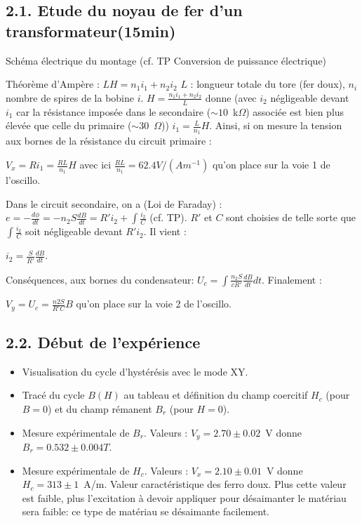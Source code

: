\documentclass[french, a4paper, 10pt, twocolumn, landscape]{article}
\begin{document}
\subsection*{2.1. Etude du noyau de fer d'un transformateur(15min)}

Schéma électrique du montage (cf. TP Conversion de puissance électrique)

Théorème d'Ampère : $L H = n_1 i_1 + n_2 i_2$
$L$ : longueur totale du tore (fer doux), $n_i$ nombre de spires de la bobine $i$. $H = \frac{n_1 i_1 + n_2 i_2}{L}$ donne (avec $i_2$ négligeable devant $i_1$ car la résistance imposée dans le secondaire ($\sim 10$~k$\Omega$) associée est bien plus élevée que celle du primaire ($\sim 30$~$\Omega$)) $i_1 = \frac{L}{n_1} H$. Ainsi, si on mesure la tension aux bornes de la résistance du circuit primaire : 

$V_x = R i_1 = \frac{R L}{n_1} H$ avec ici $\frac{R L}{n_1} = 62.4 V/(Am^{-1})$ qu'on place sur la voie 1 de l'oscillo.

Dans le circuit secondaire, on a (Loi de Faraday) : $e = -\frac{d \phi}{d t} = -n_2 S \frac{d B}{d t} = R' i_2 + \int \frac{i_2}{C}$ (cf. TP). $R'$ et $C$ sont choisies de telle sorte que $\int \frac{i_2}{C}$ soit négligeable devant $R' i_2$. Il vient :

$i_2 = \frac{S}{R'} \frac{d B}{d t}$.

Conséquences, aux bornes du condensateur: $U_c = \int \frac{n_2 S}{c R'} \frac{d B}{d t} d t$. Finalement :

$V_y = U_c = \frac{n2 S}{R' C} B$ qu'on place sur la voie 2 de l'oscillo.

\subsection*{2.2. Début de l'expérience}

\begin{itemize}
    \item Visualisation du cycle d'hystérésis avec le mode XY.
    \item Tracé du cycle $B(H)$ au tableau et définition du champ coercitif $H_c$ (pour $B=0$) et du champ rémanent $B_r$ (pour $H=0$).
    \item Mesure expérimentale de $B_r$. Valeurs : $V_y = 2.70 \pm 0.02$~V donne $B_r = 0.532 \pm 0.004 T$. 
    \item Mesure expérimentale de $H_c$. Valeurs : $V_x = 2.10 \pm 0.01$~V donne $H_c = 313 \pm 1$~A/m. Valeur caractéristique des ferro doux. Plus cette valeur est faible, plus l'excitation à devoir appliquer pour désaimanter le matériau sera faible: ce type de matériau se désaimante facilement.  
\end{itemize}
\end{document}
